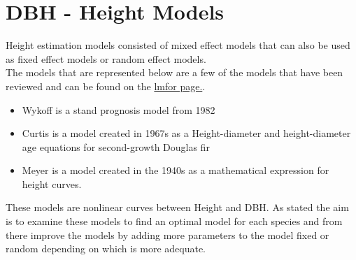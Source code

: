 \documentclass[a4paper,11pt,twoside]{report}
\begin{document}
\section{DBH - Height Models}

Height estimation models consisted of mixed effect models that can also be used as fixed effect models or random effect models. \\
The models that are represented below are a few of the models  that have been reviewed and can be found on the \href{https://cran.r-project.org/web/packages/lmfor/lmfor.pdf}{lmfor page.}.
\begin{itemize}
    \item Wykoff is a stand prognosis model from 1982 \cite{wykoff1982user}
    \item Curtis is a model created in 1967s as a Height-diameter and height-diameter age equations for
second-growth Douglas fir\cite{10.1093/forestscience/13.4.365}
\item Meyer is a model created in the 1940s as a mathematical expression for height curves. \cite{meyer1940mathematical}
\end{itemize}
These models are nonlinear curves between Height and DBH. As stated the aim is to examine these models to find an optimal model for each species and from there improve the models by adding more parameters to the model fixed or random depending on which is more adequate. 
\end{document}
